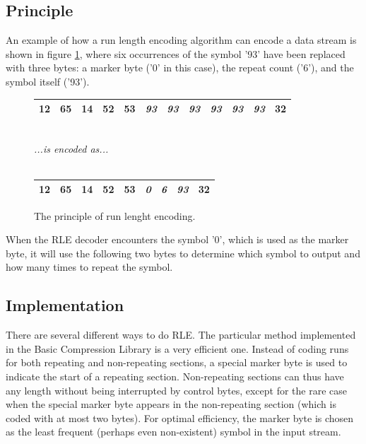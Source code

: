 \documentclass[a4paper,11pt,oneside]{report}
\begin{document}
\subsection{Principle}
An example of how a run length encoding algorithm can encode a data
stream is shown in figure \ref{fig:rle}, where six occurrences of the symbol '93'
have been replaced with three bytes: a marker byte ('0' in this case),
the repeat count ('6'), and the symbol itself ('93').

\begin{figure}
\begin{center}
\begin{tabular}{|l|l|l|l|l|l|l|l|l|l|l|l|}\hline
12 & 65 & 14 & 52 & 53 & \emph{\textbf{93}} & \emph{\textbf{93}} & \emph{\textbf{93}} & \emph{\textbf{93}} & \emph{\textbf{93}} & \emph{\textbf{93}} & 32\\\hline
\end{tabular}

\ \\
\emph{...is encoded as...}
\\\ \\

\begin{tabular}{|l|l|l|l|l|l|l|l|l|}\hline
12 & 65 & 14 & 52 & 53 & \emph{\textbf{0}} & \emph{\textbf{6}} & \emph{\textbf{93}} & 32\\\hline
\end{tabular}
\end{center}
\caption{The principle of run lenght encoding.}
\label{fig:rle}
\end{figure}

When the RLE decoder encounters the symbol '0', which is used as the marker
byte, it will use the following two bytes to determine which symbol to output
and how many times to repeat the symbol.


\subsection{Implementation}
There are several different ways to do RLE. The particular method
implemented in the Basic Compression Library is a very efficient one.
Instead of coding runs for both repeating and non-repeating sections, a
special marker byte is used to indicate the start of a repeating section.
Non-repeating sections can thus have any length without being interrupted
by control bytes, except for the rare case when the special marker byte
appears in the non-repeating section (which is coded with at most two
bytes). For optimal efficiency, the marker byte is chosen as the least
frequent (perhaps even non-existent) symbol in the input stream.
\end{document}
